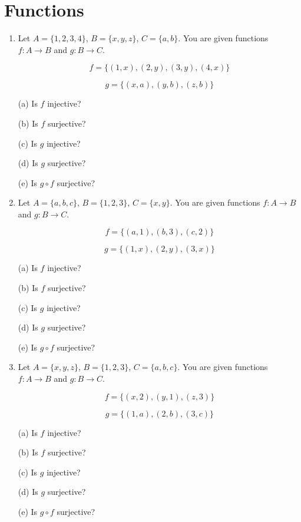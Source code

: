 \documentclass[11pt,paper=b5,footinclude,headinclude]{scrbook} %
\theoremstyle{remark}
\theoremstyle{definition} %
\theoremstyle{theorem} %
\begin{document}
\section{Functions}
\begin{enumerate}

\item Let $A = \{1,2,3,4\}$, $B = \{x,y,z\}$, $C = \{a,b\}$. You are given functions $f:A\to B$ and $g:B\to C$.

\[ f = \{(1,x),(2,y),(3,y),(4,x)\} \]

\[ g = \{(x,a),(y,b),(z,b)\} \]

(a) Is $f$ injective?

(b) Is $f$ surjective?

(c) Is $g$ injective?

(d) Is $g$ surjective?

(e) Is $g \circ f$ surjective?

\item Let $A = \{a,b,c\}$, $B = \{1,2,3\}$, $C = \{x,y\}$. You are given functions $f:A\to B$ and $g:B\to C$.

\[ f = \{(a,1),(b,3),(c,2)\} \]

\[ g = \{(1,x),(2,y),(3,x)\} \]

(a) Is $f$ injective?

(b) Is $f$ surjective?

(c) Is $g$ injective?

(d) Is $g$ surjective?

(e) Is $g \circ f$ surjective?

\item Let $A = \{x,y,z\}$, $B = \{1,2,3\}$, $C = \{a,b,c\}$. You are given functions $f:A\to B$ and $g:B\to C$.

\[ f = \{(x,2),(y,1),(z,3)\} \]

\[ g = \{(1,a),(2,b),(3,c)\} \]

(a) Is $f$ injective?

(b) Is $f$ surjective?

(c) Is $g$ injective?

(d) Is $g$ surjective?

(e) Is $g \circ f$ surjective?

\end{enumerate}
\end{document}
